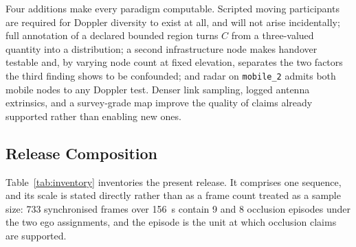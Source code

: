 Four additions make every paradigm computable. Scripted moving participants are
required for Doppler diversity to exist at all, and will not arise incidentally;
full annotation of a declared bounded region turns $C$ from a three-valued
quantity into a distribution; a second infrastructure node makes handover
testable and, by varying node count at fixed elevation, separates the two
factors the third finding shows to be confounded; and radar on \texttt{mobile\_2}
admits both mobile nodes to any Doppler test. Denser link sampling, logged
antenna extrinsics, and a survey-grade map improve the quality of claims already
supported rather than enabling new ones.

\subsection{Release Composition}
\label{sec:conditions}

Table~\ref{tab:inventory} inventories the present release. It comprises one
sequence, and its scale is stated directly rather than as a frame count treated
as a sample size: \num{733} synchronised frames over \SI{156}{\second} contain
\num{9} and \num{8} occlusion episodes under the two ego assignments, and the
episode is the unit at which occlusion claims are supported.

